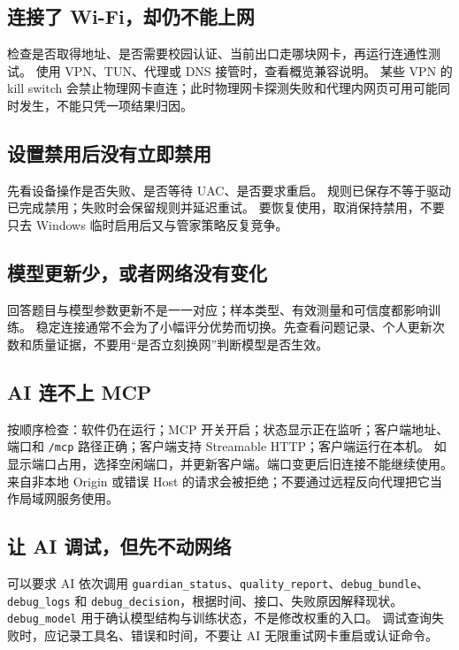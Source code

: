 \documentclass[UTF8,fontset=fandol,11pt,a4paper]{ctexart}
\newcommand{\tool}[1]{\nolinkurl{#1}}
\begin{document}
\subsection{连接了 Wi-Fi，却仍不能上网}
检查是否取得地址、是否需要校园认证、当前出口走哪块网卡，再运行连通性测试。
使用 VPN、TUN、代理或 DNS 接管时，查看概览兼容说明。
某些 VPN 的 kill switch 会禁止物理网卡直连；此时物理网卡探测失败和代理内网页可用可能同时发生，不能只凭一项结果归因。

\subsection{设置禁用后没有立即禁用}
先看设备操作是否失败、是否等待 UAC、是否要求重启。
规则已保存不等于驱动已完成禁用；失败时会保留规则并延迟重试。
要恢复使用，取消保持禁用，不要只去 Windows 临时启用后又与管家策略反复竞争。

\subsection{模型更新少，或者网络没有变化}
回答题目与模型参数更新不是一一对应；样本类型、有效测量和可信度都影响训练。
稳定连接通常不会为了小幅评分优势而切换。先查看问题记录、个人更新次数和质量证据，不要用“是否立刻换网”判断模型是否生效。

\subsection{AI 连不上 MCP}
按顺序检查：软件仍在运行；MCP 开关开启；状态显示正在监听；客户端地址、端口和 \tool{/mcp} 路径正确；客户端支持 Streamable HTTP；客户端运行在本机。
如显示端口占用，选择空闲端口，并更新客户端。端口变更后旧连接不能继续使用。
来自非本地 Origin 或错误 Host 的请求会被拒绝；不要通过远程反向代理把它当作局域网服务使用。

\subsection{让 AI 调试，但先不动网络}
可以要求 AI 依次调用 \tool{guardian_status}、\tool{quality_report}、\tool{debug_bundle}、\tool{debug_logs} 和 \tool{debug_decision}，根据时间、接口、失败原因解释现状。
\tool{debug_model} 用于确认模型结构与训练状态，不是修改权重的入口。
调试查询失败时，应记录工具名、错误和时间，不要让 AI 无限重试网卡重启或认证命令。
\end{document}
